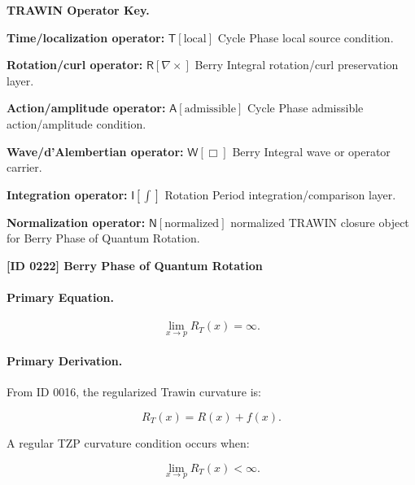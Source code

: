 \par\vspace{0.45\baselineskip}
\noindent\begin{minipage}[t]{\linewidth}
\begingroup
\small
\raggedright
\textbf{TRAWIN Operator Key.}\par
\noindent\textbf{Time/localization operator:} $\mathsf{T}\!\left[\mathrm{local}\right]$ Cycle Phase local source condition.\par
\noindent\textbf{Rotation/curl operator:} $\mathsf{R}\!\left[\nabla\times\right]$ Berry Integral rotation/curl preservation layer.\par
\noindent\textbf{Action/amplitude operator:} $\mathsf{A}\!\left[\mathrm{admissible}\right]$ Cycle Phase admissible action/amplitude condition.\par
\noindent\textbf{Wave/d'Alembertian operator:} $\mathsf{W}\!\left[\Box\right]$ Berry Integral wave or operator carrier.\par
\noindent\textbf{Integration operator:} $\mathsf{I}\!\left[\int\right]$ Rotation Period integration/comparison layer.\par
\noindent\textbf{Normalization operator:} $\mathsf{N}\!\left[\mathrm{normalized}\right]$ normalized TRAWIN closure object for Berry Phase of Quantum Rotation.\par
\endgroup
\end{minipage}

\clearpage
\noindent\textbf{[ID 0222] Berry Phase of Quantum Rotation}\par
\vspace{0.35em}
\paragraph{Primary Equation.}
\begin{equation}
\lim_{x\to p}R_T(x)=\infty .
\end{equation}

\paragraph{Primary Derivation.}
From ID 0016, the regularized Trawin curvature is:

\begin{equation}
R_T(x)=R(x)+f(x).
\end{equation}

A regular TZP curvature condition occurs when:

\begin{equation}
\lim_{x\to p}R_T(x)<\infty .
\end{equation}

